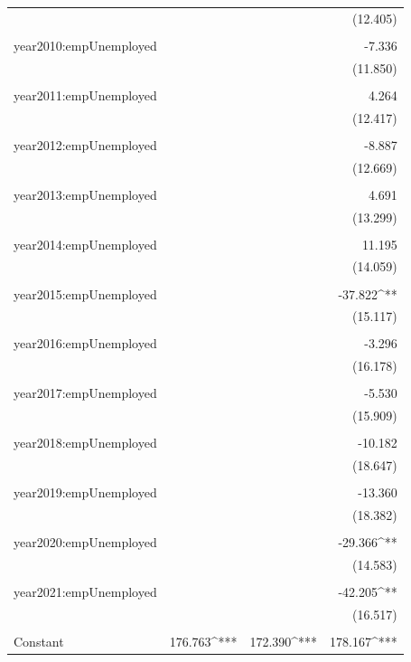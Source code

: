 \documentclass[
]{article}
\begin{document}
\begin{table}[!htbp]
\begin{tabular}{@{\extracolsep{5pt}}lD{.}{.}{-3} D{.}{.}{-3} D{.}{.}{-3} }
  &  &  & (12.405) \\ 
  & & & \\ 
 year2010:empUnemployed &  &  & -7.336 \\ 
  &  &  & (11.850) \\ 
  & & & \\ 
 year2011:empUnemployed &  &  & 4.264 \\ 
  &  &  & (12.417) \\ 
  & & & \\ 
 year2012:empUnemployed &  &  & -8.887 \\ 
  &  &  & (12.669) \\ 
  & & & \\ 
 year2013:empUnemployed &  &  & 4.691 \\ 
  &  &  & (13.299) \\ 
  & & & \\ 
 year2014:empUnemployed &  &  & 11.195 \\ 
  &  &  & (14.059) \\ 
  & & & \\ 
 year2015:empUnemployed &  &  & -37.822^{**} \\ 
  &  &  & (15.117) \\ 
  & & & \\ 
 year2016:empUnemployed &  &  & -3.296 \\ 
  &  &  & (16.178) \\ 
  & & & \\ 
 year2017:empUnemployed &  &  & -5.530 \\ 
  &  &  & (15.909) \\ 
  & & & \\ 
 year2018:empUnemployed &  &  & -10.182 \\ 
  &  &  & (18.647) \\ 
  & & & \\ 
 year2019:empUnemployed &  &  & -13.360 \\ 
  &  &  & (18.382) \\ 
  & & & \\ 
 year2020:empUnemployed &  &  & -29.366^{**} \\ 
  &  &  & (14.583) \\ 
  & & & \\ 
 year2021:empUnemployed &  &  & -42.205^{**} \\ 
  &  &  & (16.517) \\ 
  & & & \\ 
 Constant & 176.763^{***} & 172.390^{***} & 178.167^{***} \\ 

\end{tabular}
\end{table}
\end{document}
